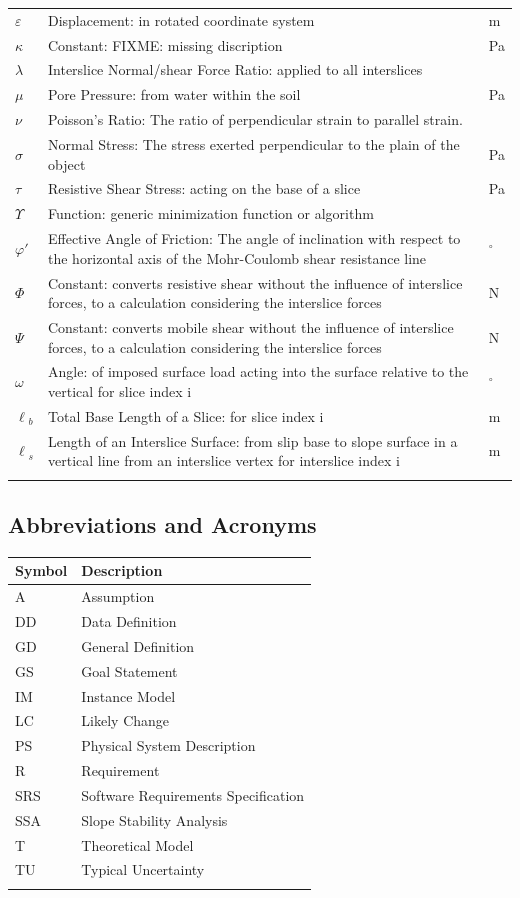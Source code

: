 \documentclass[12pt]{article}
\begin{document}
\begin{longtabu}{l X[l] l}
$\varepsilon{}$ & Displacement: in rotated coordinate system & m
\\
$\kappa{}$ & Constant: FIXME: missing discription & Pa
\\
$\lambda{}$ & Interslice Normal/shear Force Ratio: applied to all interslices & 
\\
$\mu{}$ & Pore Pressure: from water within the soil & Pa
\\
$\nu{}$ & Poisson's Ratio: The ratio of perpendicular strain to parallel strain. & 
\\
$\sigma{}$ & Normal Stress: The stress exerted perpendicular to the plain of the object & Pa
\\
$\tau{}$ & Resistive Shear Stress: acting on the base of a slice & Pa
\\
$\Upsilon{}$ & Function: generic minimization function or algorithm & 
\\
$\varphi{}'$ & Effective Angle of Friction: The angle of inclination with respect to the horizontal axis of the Mohr-Coulomb shear resistance line & ${}^{\circ}$
\\
$\Phi{}$ & Constant: converts resistive shear without the influence of interslice forces, to a calculation considering the interslice forces & N
\\
$\Psi{}$ & Constant: converts mobile shear without the influence of interslice forces, to a calculation considering the interslice forces & N
\\
$\omega{}$ & Angle: of imposed surface load acting into the surface relative to the vertical for slice index i & ${}^{\circ}$
\\
${\ell{}_{b}}$ & Total Base Length of a Slice: for slice index i & m
\\
${\ell{}_{s}}$ & Length of an Interslice Surface: from slip base to slope surface in a vertical line from an interslice vertex for interslice index i & m
\\
\bottomrule
\label{Table:ToS}
\end{longtabu}
\subsection{Abbreviations and Acronyms}
\label{Sec:TAbbAcc}
\begin{longtable*}{l l}
\toprule
Symbol & Description
\\
\midrule
A & Assumption
\\
DD & Data Definition
\\
GD & General Definition
\\
GS & Goal Statement
\\
IM & Instance Model
\\
LC & Likely Change
\\
PS & Physical System Description
\\
R & Requirement
\\
SRS & Software Requirements Specification
\\
SSA & Slope Stability Analysis
\\
T & Theoretical Model
\\
TU & Typical Uncertainty
\\
\bottomrule
\label{Table:TAbbAcc}
\end{longtable*}
\end{document}
